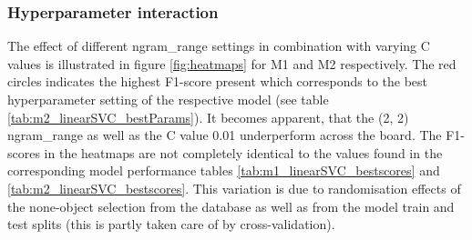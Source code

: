 \subsubsection{Hyperparameter interaction}
The effect of different ngram\_range settings in combination with varying C values is illustrated in figure \ref{fig:heatmaps} for M1 and M2 respectively. The red circles indicates the highest F1-score present which corresponds to the best hyperparameter setting of the respective model (see table \ref{tab:m2_linearSVC_bestParams}). It becomes apparent, that the (2, 2) ngram\_range as well as the C value 0.01 underperform across the board. The F1-scores in the heatmaps are not completely identical to the values found in the corresponding model performance tables \ref{tab:m1_linearSVC_bestscores} and \ref{tab:m2_linearSVC_bestscores}. This variation is due to randomisation effects of the none-object selection from the database as well as from the model train and test splits (this is partly taken care of by cross-validation).\\

